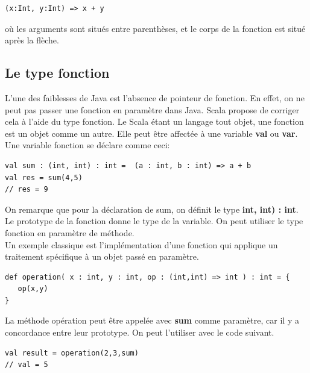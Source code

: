 \documentclass[a4paper,11pt]{report}
\begin{document}
{{\begin{lstlisting}
(x:Int, y:Int) => x + y
\end{lstlisting}

\normalsize{
\noindent
où les arguments sont situés entre parenthèses, et le corps de la fonction est situé après la flèche.
}

\subsection{Le type fonction}
\vspace{6mm}
\normalsize{
L'une des faiblesses de Java est l'absence de pointeur de fonction. En effet, on ne peut pas passer une fonction en paramètre dans Java. Scala propose de corriger cela à l'aide du type fonction. Le Scala étant un langage tout objet, une fonction est un objet comme un autre. Elle  peut être affectée à une variable {\bf val} ou {\bf var}. Une variable fonction se déclare comme ceci:\\
}

\begin{lstlisting}
val sum : (int, int) : int =  (a : int, b : int) => a + b
val res = sum(4,5)
// res = 9
\end{lstlisting}
\newpage
\normalsize{
On remarque que pour la déclaration de sum, on définit le type {\bf int, int) : int}. Le prototype de la fonction donne le type de la variable. On peut utiliser le type fonction en paramètre de méthode. \\

Un exemple classique est l'implémentation d'une fonction qui applique un traitement spécifique à un objet passé en paramètre.\\
}

\begin{lstlisting}
def operation( x : int, y : int, op : (int,int) => int ) : int = { 
   op(x,y) 
}
\end{lstlisting}
\vspace{6mm}
\normalsize{
La méthode opération peut être appelée avec {\bf sum} comme paramètre, car il y a concordance entre leur prototype. On peut l'utiliser avec le code suivant.\\
}

 \begin{lstlisting}
val result = operation(2,3,sum)
// val = 5 
\end{lstlisting}
\vspace{6mm}

\normalsize{

}}}
\end{document}
